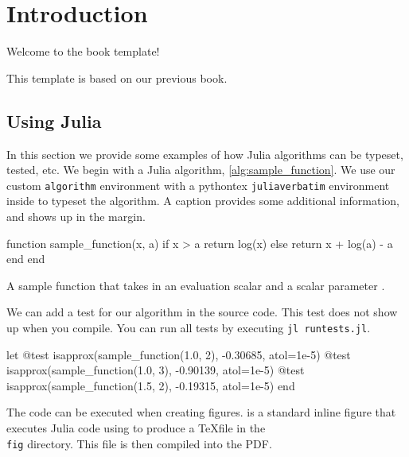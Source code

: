 \chapter{Introduction}
\label{ch:introduction}

Welcome to the book template!



This template is based on our previous book.\cite{Kochenderfer2019}

\section{Using Julia}

In this section we provide some examples of how Julia algorithms can be typeset, tested, etc.
We begin with a Julia algorithm, \cref{alg:sample_function}.
We use our custom \texttt{algorithm} environment with a pythontex \texttt{juliaverbatim} environment inside to typeset the algorithm.
A caption provides some additional information, and shows up in the margin.

\begin{algorithm}
\begin{juliaverbatim}
function sample_function(x, a)
	if x > a
		return log(x)
	else
		return x + log(a) - a
	end
end
\end{juliaverbatim}
\caption{
	\label{alg:sample_function}
	A sample function that takes in an evaluation scalar  and a scalar parameter .
}
\end{algorithm}

We can add a test for our algorithm in the source code.
This test does not show up when you compile.
You can run all tests by executing \texttt{jl runtests.jl}.

\begin{juliatest}
let
	@test isapprox(sample_function(1.0, 2), -0.30685, atol=1e-5)
	@test isapprox(sample_function(1.0, 3), -0.90139, atol=1e-5)
	@test isapprox(sample_function(1.5, 2), -0.19315, atol=1e-5)
end
\end{juliatest}

The code can be executed when creating figures.
 is a standard inline figure that executes Julia code using  to produce a \TeX file in the \texttt{\\fig} directory.
This file is then compiled into the PDF.

